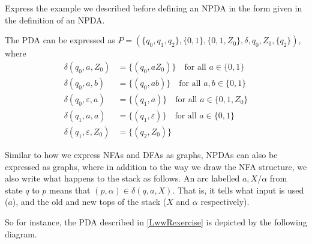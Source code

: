 \begin{exercise}
\label{LwwRexercise}
Express the example we described before defining an NPDA in the form given in the definition of an NPDA.
\end{exercise}
\begin{solution}
The PDA can be expressed as $P=(\{q_0,q_1,q_2\}, \{0,1\}, \{0,1,Z_0\}, \delta, q_0,Z_0, \{q_2\})$, where
\begin{align*}
    \delta(q_0,a,Z_0) &= \{(q_0,aZ_0)\}\quad\text{for all $a\in\{0,1\}$} \\
    \delta(q_0,a,b) &= \{(q_0,ab)\}\quad\text{for all $a,b\in\{0,1\}$} \\
    \delta(q_0,\varepsilon,a) &= \{(q_1,a)\}\quad\text{for all $a\in\{0,1,Z_0\}$} \\
    \delta(q_1,a,a) &= \{(q_1,\varepsilon)\}\quad\text{for all $a\in\{0,1\}$} \\
    \delta(q_1,\varepsilon,Z_0) &= \{(q_2,Z_0)\}
\end{align*}
\end{solution}
    
\vspace{3mm}
Similar to how we express NFAs and DFAs as graphs, NPDAs can also be expressed as graphs, where in addition to the way we draw the NFA structure, we also write what happens to the stack as follows. An arc labelled $a,X/\alpha$ from state $q$ to $p$ means that $(p,\alpha)\in\delta(q,a,X)$. That is, it tells what input is used ($a$), and the old and new tops of the stack ($X$ and $\alpha$ respectively).

\vspace{3mm}
So for instance, the PDA described in \ref{LwwRexercise} is depicted by the following diagram.

\begin{center}
\end{center}

